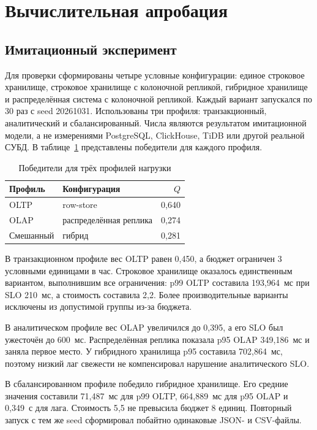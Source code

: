 \documentclass{misisarticle}
\begin{document}
\section{Вычислительная апробация}

\subsection{\textnormal{Имитационный эксперимент}}

	Для проверки сформированы четыре условные конфигурации: единое строковое хранилище, строковое хранилище с колоночной репликой, гибридное хранилище и распределённая система с колоночной репликой. Каждый вариант запускался по 30 раз с seed 20261031. Использованы три профиля: транзакционный, аналитический и сбалансированный. Числа являются результатом имитационной модели, а не измерениями PostgreSQL, ClickHouse, TiDB или другой реальной СУБД. В таблице~\ref{tab:results} представлены победители для каждого профиля.

\begin{table}[htbp]
  \caption{Победители для трёх профилей нагрузки}
  \label{tab:results}
  \centering
  \small
  \begin{tabular}{@{}llr@{}}
    \toprule
    \textbf{Профиль} & \textbf{Конфигурация} & \textbf{$Q$} \\
    \midrule
    OLTP & row-store & 0{,}640 \\
    OLAP & распределённая реплика & 0{,}274 \\
    Смешанный & гибрид & 0{,}281 \\
    \bottomrule
  \end{tabular}
\end{table}

	В транзакционном профиле вес OLTP равен 0{,}450, а бюджет ограничен 3 условными единицами в час. Строковое хранилище оказалось единственным вариантом, выполнившим все ограничения: p99 OLTP составила 193{,}964~мс при SLO 210~мс, а стоимость составила 2{,}2. Более производительные варианты исключены из допустимой группы из-за бюджета.

	В аналитическом профиле вес OLAP увеличился до 0{,}395, а его SLO был ужесточён до 600~мс. Распределённая реплика показала p95 OLAP 349{,}186~мс и заняла первое место. У гибридного хранилища p95 составила 702{,}864~мс, поэтому низкий лаг свежести не компенсировал нарушение аналитического SLO.

	В сбалансированном профиле победило гибридное хранилище. Его средние значения составили 71{,}487~мс для p99 OLTP, 664{,}889~мс для p95 OLAP и 0{,}349~с для лага. Стоимость 5{,}5 не превысила бюджет 8 единиц. Повторный запуск с тем же seed сформировал побайтно одинаковые JSON- и CSV-файлы.
\end{document}
